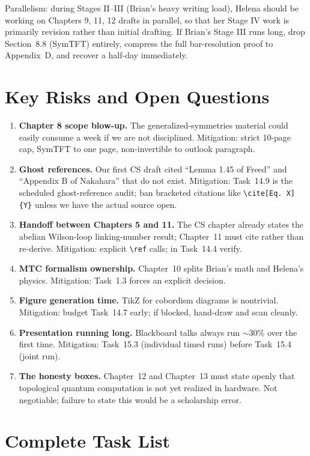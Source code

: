 \documentclass[11pt]{article}
\begin{document}
\noindent Parallelism: during Stages II--III (Brian's heavy writing load), Helena should
be working on Chapters 9, 11, 12 drafts in parallel, so that her Stage IV work is
primarily revision rather than initial drafting. If Brian's Stage III runs long, drop
Section~8.8 (SymTFT) entirely, compress the full bar-resolution proof to Appendix~D,
and recover a half-day immediately.

\section{Key Risks and Open Questions}\label{sec:risks}

\begin{enumerate}[leftmargin=2em]
\item \textbf{Chapter 8 scope blow-up.} The generalized-symmetries material could easily
consume a week if we are not disciplined. Mitigation: strict 10-page cap, SymTFT to one
page, non-invertible to outlook paragraph.
\item \textbf{Ghost references.} Our first CS draft cited ``Lemma 1.45 of Freed'' and
``Appendix B of Nakahara'' that do not exist. Mitigation: Task~14.9 is the scheduled
ghost-reference audit; ban bracketed citations like \texttt{\textbackslash cite[Eq.~X]\{Y\}}
unless we have the actual source open.
\item \textbf{Handoff between Chapters 5 and 11.} The CS chapter already states the
abelian Wilson-loop linking-number result; Chapter~11 must cite rather than re-derive.
Mitigation: explicit \texttt{\textbackslash ref} calls; in Task~14.4 verify.
\item \textbf{MTC formalism ownership.} Chapter~10 splits Brian's math and Helena's
physics. Mitigation: Task~1.3 forces an explicit decision.
\item \textbf{Figure generation time.} TikZ for cobordism diagrams is nontrivial.
Mitigation: budget Task~14.7 early; if blocked, hand-draw and scan cleanly.
\item \textbf{Presentation running long.} Blackboard talks always run $\sim 30\%$ over
the first time. Mitigation: Task~15.3 (individual timed runs) before Task~15.4 (joint run).
\item \textbf{The honesty boxes.} Chapter~12 and Chapter~13 must state openly that
topological quantum computation is not yet realized in hardware. Not negotiable; failure
to state this would be a scholarship error.
\end{enumerate}

\section{Complete Task List}\label{sec:tasks}
\end{document}
